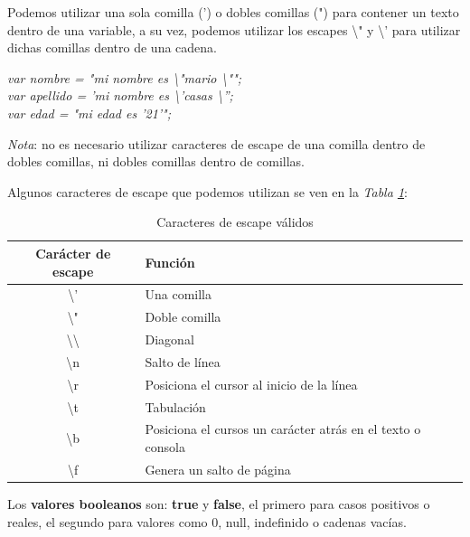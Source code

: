 Podemos utilizar una sola comilla (') o dobles comillas (") para contener un texto dentro de una variable, a su vez, podemos utilizar los escapes \textbackslash " y \textbackslash ' para utilizar dichas comillas dentro de una cadena.
\begin{center}
    \textit{
            var nombre = "mi nombre es \textbackslash "mario \textbackslash ""; \\
            var apellido = 'mi nombre es \textbackslash 'casas \textbackslash ''; \\
            var edad = "mi edad es '21'";
            }
\end{center}

\textit{Nota}: no es necesario utilizar caracteres de escape de una comilla dentro de dobles comillas, ni dobles comillas dentro de comillas.

Algunos caracteres de escape que podemos utilizan se ven en la \textit{Tabla \ref{tab: 1}}:
\begin{table}[H]
    \begin{center}
        \caption{Caracteres de escape válidos}
        \label{tab: 1}
        \begin{tabular}{c l}
            \hline
            \textbf{Carácter de escape}&\textbf{Función} \\
            \hline
            \textbackslash ' & Una comilla \\
            \textbackslash " & Doble comilla \\
            \textbackslash \textbackslash & Diagonal \\
            \textbackslash n & Salto de línea \\
            \textbackslash r & Posiciona el cursor al inicio de la línea \\
            \textbackslash t & Tabulación \\
            \textbackslash b & Posiciona el cursos un carácter atrás en el texto o consola \\
            \textbackslash f & Genera un salto de página \\
            \hline
        \end{tabular}
    \end{center}
\end{table}

Los \textbf{valores booleanos} son: \textbf{true} y \textbf{false}, el primero para casos positivos o reales, el segundo para valores como 0, null, indefinido o cadenas vacías.


